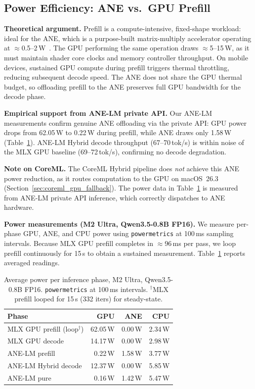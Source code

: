 \documentclass[11pt]{article}
\begin{document}
\subsection{Power Efficiency: ANE vs.\ GPU Prefill}
\label{sec:power}

\textbf{Theoretical argument.}
Prefill is a compute-intensive, fixed-shape workload: ideal for the ANE,
which is a purpose-built matrix-multiply accelerator operating at
$\approx$0.5--2\,W~\cite{anelm}.
The GPU performing the same operation draws $\approx$5--15\,W,
as it must maintain shader core clocks and memory controller throughput.
On mobile devices, sustained GPU compute during prefill triggers thermal
throttling, reducing subsequent decode speed.
The ANE does not share the GPU thermal budget, so offloading prefill to
the ANE preserves full GPU bandwidth for the decode phase.

\textbf{Empirical support from ANE-LM private API.}
Our ANE-LM measurements confirm genuine ANE offloading via the private
API: GPU power drops from 62.05\,W to 0.22\,W during prefill, while ANE
draws only 1.58\,W (Table~\ref{tab:power}).
ANE-LM Hybrid decode throughput (67--70\,tok/s) is within noise of the MLX
GPU baseline (69--72\,tok/s), confirming no decode degradation.

\textbf{Note on CoreML.}
The CoreML Hybrid pipeline does \emph{not} achieve this ANE power
reduction, as it routes computation to the GPU on macOS~26.3
(Section~\ref{sec:coreml_gpu_fallback}).
The power data in Table~\ref{tab:power} is measured from ANE-LM
private API inference, which correctly dispatches to ANE hardware.

\textbf{Power measurements (M2 Ultra, Qwen3.5-0.8B FP16).}
We measure per-phase GPU, ANE, and CPU power using \texttt{powermetrics}
at 100\,ms sampling intervals.
Because MLX GPU prefill completes in $\approx$96\,ms per pass, we loop
prefill continuously for 15\,s to obtain a sustained measurement.
Table~\ref{tab:power} reports averaged readings.

\begin{table}[h]
\centering
\small
\begin{tabular}{@{}lrrr@{}}
\toprule
Phase & GPU & ANE & CPU \\
\midrule
MLX GPU prefill (loop$^\dagger$) & 62.05\,W & 0.00\,W & 2.34\,W \\
MLX GPU decode                   & 14.17\,W & 0.00\,W & 2.98\,W \\
ANE-LM prefill                   &  0.22\,W & 1.58\,W & 3.77\,W \\
ANE-LM Hybrid decode             & 12.37\,W & 0.00\,W & 5.85\,W \\
ANE-LM pure                      &  0.16\,W & 1.42\,W & 5.47\,W \\
\bottomrule
\end{tabular}
\caption{Average power per inference phase, M2 Ultra, Qwen3.5-0.8B FP16.
  \texttt{powermetrics} at 100\,ms intervals.
  $^\dagger$MLX prefill looped for 15\,s (332 iters) for steady-state.}
\label{tab:power}
\end{table}
\end{document}
